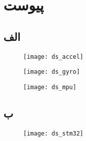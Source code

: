 \chapter*{‌پیوست}
\section*{الف} \label{apendix:mpu}
\begin{figure}[h!]
	\centering
	\texttt{[image: ds\_accel]}
\end{figure}
\begin{figure}[h!]
	\centering
	\texttt{[image: ds\_gyro]}
\end{figure}
\begin{figure}[h!]
	\centering
	\texttt{[image: ds\_mpu]}
\end{figure}

\newpage
\section*{ب} \label{apendix:mpu2}
\begin{figure}[h]
	\centering
	\texttt{[image: ds\_stm32]}
\end{figure}
